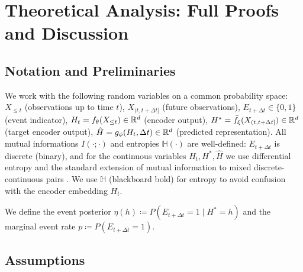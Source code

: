 
\section{Theoretical Analysis: Full Proofs and Discussion}
\label{app:theory}

\subsection{Notation and Preliminaries}

We work with the following random variables on a common probability space:
$X_{\leq t}$ (observations up to time $t$),
$X_{(t,t+\Delta t]}$ (future observations),
$E_{t+\Delta t} \in \{0,1\}$ (event indicator),
$H_t = f_\theta(X_{\leq t}) \in \mathbb{R}^d$ (encoder output),
$H^* = \bar{f}_\xi(X_{(t,t+\Delta t]}) \in \mathbb{R}^d$ (target encoder output),
$\hat{H} = g_\phi(H_t, \Delta t) \in \mathbb{R}^d$ (predicted representation).
All mutual informations $I(\cdot;\cdot)$ and entropies $\mathbb{H}(\cdot)$ are well-defined: $E_{t+\Delta t}$ is discrete (binary), and for the continuous variables $H_t, H^*, \hat{H}$ we use differential entropy and the standard extension of mutual information to mixed discrete-continuous pairs \citep[Ch.~8--9]{cover2006elements}. We use $\mathbb{H}$ (blackboard bold) for entropy to avoid confusion with the encoder embedding $H_t$.

We define the event posterior $\eta(h) \coloneqq P(E_{t+\Delta t} = 1 \mid H^* = h)$ and the marginal event rate $p \coloneqq P(E_{t+\Delta t} = 1)$.

\subsection{Assumptions}

